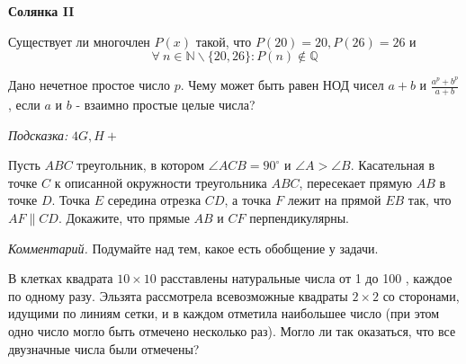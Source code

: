 \centerline{\bf \Huge Солянка II}
\centerline{\bf \Huge }

\begin{flushright}
        \scriptsize{}
\end{flushright}

Существует ли многочлен $P(x)$ такой, что $P(20)=20, P(26)=26$ и $$\forall \ n \in \mathbb{N}\backslash\{20,26\}:  P(n)\not\in \mathbb{Q}$$


Дано нечетное простое число $p$. Чему может быть равен НОД чисел $a+b$ и $\frac{a^p+b^p}{a+b}$, если $a$ и $b$ - взаимно простые целые числа?


\textit{Подсказка:} $4G, H+$

Пусть $A B C$ треугольник, в котором $\angle A C B=90^{\circ}$ и $\angle A>\angle B$. Касательная в точке $C$ к описанной окружности треугольника $A B C$, пересекает прямую $A B$ в точке $D$. Точка $E$ середина отрезка $C D$, а точка $F$ лежит на прямой $E B$ так, что $A F \| C D$. Докажите, что прямые $A B$ и $C F$ перпендикулярны.


\textit{Комментарий.} Подумайте над тем, какое есть обобщение у задачи.

В клетках квадрата $10 \times 10$ расставлены натуральные числа от 1 до 100 , каждое по одному разу. Эльзята рассмотрела всевозможные квадраты $2\times 2$ со сторонами, идущими по линиям сетки, и в каждом отметила наибольшее число (при этом одно число могло быть отмечено несколько раз). Могло ли так оказаться, что все двузначные числа были отмечены?

